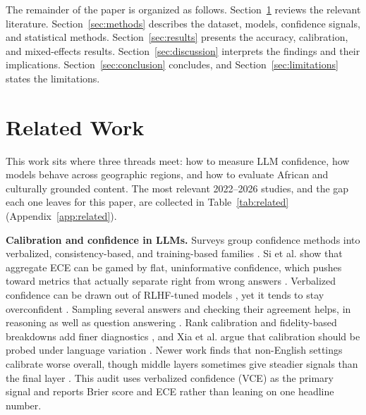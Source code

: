 \documentclass[11pt]{article}
\begin{document}
The remainder of the paper is organized as follows. Section~\ref{sec:related} reviews the relevant literature. Section~\ref{sec:methods} describes the dataset, models, confidence signals, and statistical methods. Section~\ref{sec:results} presents the accuracy, calibration, and mixed-effects results. Section~\ref{sec:discussion} interprets the findings and their implications. Section~\ref{sec:conclusion} concludes, and Section~\ref{sec:limitations} states the limitations.

\section{Related Work}
\label{sec:related}

This work sits where three threads meet: how to measure LLM confidence, how models behave across geographic regions, and how to evaluate African and culturally grounded content. The most relevant 2022--2026 studies, and the gap each one leaves for this paper, are collected in Table~\ref{tab:related} (Appendix~\ref{app:related}).

\textbf{Calibration and confidence in LLMs.} Surveys group confidence methods into verbalized, consistency-based, and training-based families \cite{geng2024survey}. Si et al. show that aggregate ECE can be gamed by flat, uninformative confidence, which pushes toward metrics that actually separate right from wrong answers \cite{si2022reexamining}. Verbalized confidence can be drawn out of RLHF-tuned models \cite{lin2022teaching,mielke2022reducing}, yet it tends to stay overconfident \cite{tian2023just,xiong2024can}. Sampling several answers and checking their agreement helps, in reasoning as well as question answering \cite{wang2023selfconsistency,kuhn2023semantic,manakul2023selfcheckgpt,wang2024self}. Rank calibration and fidelity-based breakdowns add finer diagnostics \cite{huang2024rank,zhang2024calibrating}, and Xia et al. argue that calibration should be probed under language variation \cite{xia2026calibration}. Newer work finds that non-English settings calibrate worse overall, though middle layers sometimes give steadier signals than the final layer \cite{zhou2025beyond}. This audit uses verbalized confidence (VCE) as the primary signal and reports Brier score and ECE rather than leaning on one headline number.
\end{document}
